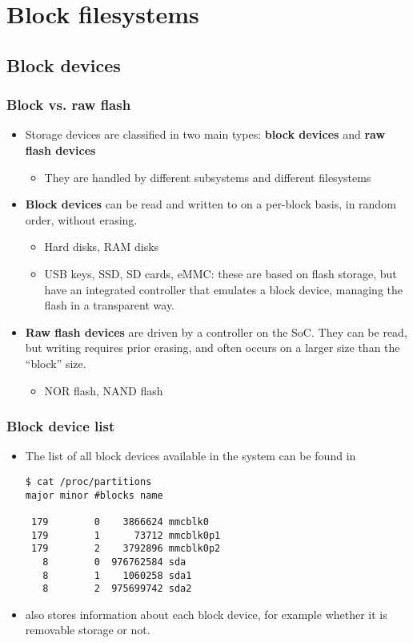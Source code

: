 \section{Block filesystems}

\subsection{Block devices}

\begin{frame}
  \frametitle{Block vs. raw flash}
  \begin{itemize}
  \item Storage devices are classified in two main types: {\bf block
      devices} and {\bf raw flash devices}
    \begin{itemize}
    \item They are handled by different subsystems and different
      filesystems
    \end{itemize}
  \item {\bf Block devices} can be read and written to on a per-block
    basis, in random order, without erasing.
    \begin{itemize}
    \item Hard disks, RAM disks
    \item USB keys, SSD, SD cards, eMMC: these are based
      on flash storage, but have an integrated controller that
      emulates a block device, managing the flash in a transparent
      way.
    \end{itemize}
  \item {\bf Raw flash devices} are driven by a controller on the
      SoC. They can be read, but writing requires prior erasing,
      and often occurs on a larger size than the “block” size.
    \begin{itemize}
    \item NOR flash, NAND flash
    \end{itemize}
  \end{itemize}
\end{frame}

\begin{frame}[fragile]
  \frametitle{Block device list}
  \begin{itemize}
  \item The list of all block devices available in the system can be
    found in \\
\begin{verbatim}
$ cat /proc/partitions
major minor #blocks name

 179        0    3866624 mmcblk0
 179        1      73712 mmcblk0p1
 179        2    3792896 mmcblk0p2
   8        0  976762584 sda
   8        1    1060258 sda1
   8        2  975699742 sda2
\end{verbatim}
  \item {} also stores information about each block device,
     for example whether it is removable storage or not.
  \end{itemize}
\end{frame}

